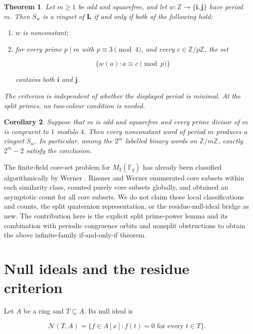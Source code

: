 \documentclass[11pt]{article}
\newtheorem{theorem}{Theorem}[section]
\newtheorem{corollary}[theorem]{Corollary}
\theoremstyle{remark}
\numberwithin{equation}{section}
\begin{document}
\begin{theorem}

Let $m\ge1$ be odd and squarefree, and let
$w:\mathbb Z\to\{\mathbf i,\mathbf j\}$ have period $m$. Then $S_w$ is a
ringset of $\mathbf L$ if and only if both of the following hold:

\begin{enumerate}
\item $w$ is nonconstant;
\item for every prime $p\mid m$ with $p\equiv3\pmod4$, and every
$c\in\mathbb Z/p\mathbb Z$, the set

\[
\{w(a):a\equiv c\pmod p\}
\]

contains both $\mathbf i$ and $\mathbf j$.

\end{enumerate}
The criterion is independent of whether the displayed period is minimal.
At the split primes, no two-colour condition is needed.

\end{theorem}
\begin{corollary}

Suppose that $m$ is odd and squarefree and every prime divisor of $m$ is
congruent to $1$ modulo $4$. Then every nonconstant word of period $m$
produces a ringset $S_w$. In particular, among the $2^m$ labelled binary
words on $\mathbb Z/m\mathbb Z$, exactly $2^m-2$ satisfy the conclusion.
\end{corollary}

The finite-field core-set problem for $M_2(\mathbb F_q)$ has already been
classified algorithmically by Werner \cite{werner2022}. Rissner and Werner \cite{rissnerwerner} enumerated
core subsets within each similarity class, counted purely core subsets
globally, and obtained an asymptotic count for all core subsets. We do not
claim those local classifications and counts, the split quaternion
representation, or the residue-null-ideal bridge as new.
The contribution here is the explicit split prime-power lemma and its
combination with periodic congruence orbits and nonsplit obstructions to
obtain the above infinite-family if-and-only-if theorem.

\section{Null ideals and the residue criterion}

Let $A$ be a ring and $T\subseteq A$. Its null ideal is

\[
\mathcal N(T,A)
=\{f\in A[x]:f(t)=0\text{ for every }t\in T\}.
\]
\end{document}

